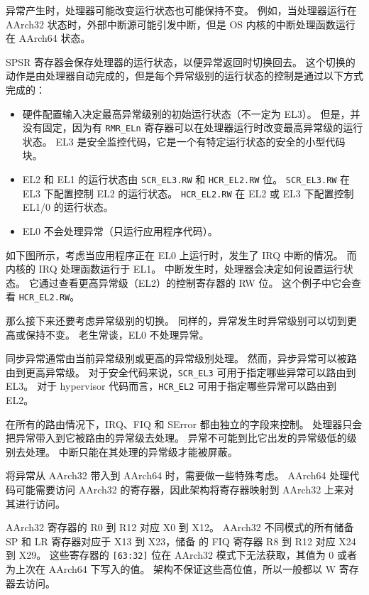 异常产生时，处理器可能改变运行状态也可能保持不变。
例如，当处理器运行在 AArch32 状态时，外部中断源可能引发中断，但是 OS 内核的中断处理函数运行在 AArch64 状态。

SPSR 寄存器会保存处理器的运行状态，以便异常返回时切换回去。
这个切换的动作是由处理器自动完成的，但是每个异常级别的运行状态的控制是通过以下方式完成的：

\begin{itemize}
  \item 硬件配置输入决定最高异常级别的初始运行状态（不一定为 EL3）。
    但是，并没有固定，因为有 \lstinline!RMR_ELn! 寄存器可以在处理器运行时改变最高异常级的运行状态。
    EL3 是安全监控代码，它是一个有特定运行状态的安全的小型代码块。
  \item EL2 和 EL1 的运行状态由 \lstinline!SCR_EL3.RW! 和 \lstinline!HCR_EL2.RW! 位。
    \lstinline!SCR_EL3.RW! 在 EL3 下配置控制 EL2 的运行状态。
    \lstinline!HCR_EL2.RW! 在 EL2 或 EL3 下配置控制 EL1/0 的运行状态。
  \item EL0 不会处理异常（只运行应用程序代码）。
\end{itemize}

如下图所示，考虑当应用程序正在 EL0 上运行时，发生了 IRQ 中断的情况。
而内核的 IRQ 处理函数运行于 EL1。
中断发生时，处理器会决定如何设置运行状态。
它通过查看更高异常级（EL2）的控制寄存器的 RW 位。
这个例子中它会查看 \lstinline!HCR_EL2.RW!。


那么接下来还要考虑异常级别的切换。
同样的，异常发生时异常级别可以切到更高或保持不变。
老生常谈，EL0 不处理异常。

同步异常通常由当前异常级别或更高的异常级别处理。
然而，异步异常可以被路由到更高异常级。
对于安全代码来说，\lstinline!SCR_EL3! 可用于指定哪些异常可以路由到 EL3。
对于 hypervisor 代码而言，\lstinline!HCR_EL2! 可用于指定哪些异常可以路由到 EL2。

在所有的路由情况下，IRQ、FIQ 和 SError 都由独立的字段来控制。
处理器只会把异常带入到它被路由的异常级去处理。
异常不可能到比它出发的异常级低的级别去处理。
中断只能在其处理的异常级才能被屏蔽。

将异常从 AArch32 带入到 AArch64 时，需要做一些特殊考虑。
AArch64 处理代码可能需要访问 AArch32 的寄存器，因此架构将寄存器映射到 AArch32 上来对其进行访问。

AArch32 寄存器的 R0 到 R12 对应 X0 到 X12。
AArch32 不同模式的所有储备 SP 和 LR 寄存器对应于 X13 到 X23，储备 的 FIQ 寄存器 R8 到 R12 对应 X24 到 X29。
这些寄存器的 \verb![63:32]! 位在 AArch32 模式下无法获取，其值为 0 或者为上次在 AArch64 下写入的值。
架构不保证这些高位值，所以一般都以 W 寄存器去访问。

